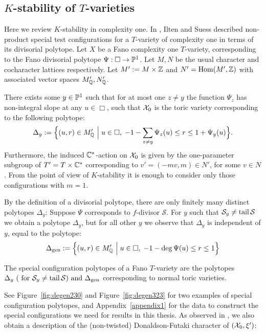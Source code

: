 \subsection{$K$-stability of $T$-varieties} \label{subsec:IS}
Here we review \(K\)-stability in complexity one. In \cite{ilten2015}, Ilten and Suess described non-product special test configurations for a \(T\)-variety of complexity one in terms of its divisorial polytope. Let \(X\) be a Fano complexity one \(T\)-variety, corresponding to the Fano divisorial polytope \(\Psi : \Box \to \mathbb{P}^1\). Let \(M,N\) be the usual character and cocharacter lattices respectively. Let \(M' := M \times \mathbb{Z}\) and \(N' = \operatorname{Hom}(M',\mathbb{Z})\) with associated vector spaces \(M_{\mathbb{Q}}', N_{\mathbb{Q}}'\).
\begin{theorem} \label{thm:iltensueskstab}
There exists some \(y \in \mathbb{P}^1\) such that for at most one \(z \neq y\) the function \(\Psi_z\) has non-integral slope at any \(u \in \Box\), such that \({\mathcal{X}}_0\) is the toric variety corresponding to the following polytope:
\begin{equation*}
\Delta_y := \Big\{(u,r) \in M_{\mathbb{Q}}' \ \Big| \; u \in \Box,\; -1-\sum_{z \neq y} \Psi_z(u) \leq r \leq 1+\Psi_y(u)\Big\}.\label{eq:special-fibre}
\end{equation*}
Furthermore, the induced \(\mathbb{C}^*\)-action on \({\mathcal{X}}_0\) is given by the one-parameter subgroup of \(T' = T \times \mathbb{C}^*\) corresponding to \(v'=(-mv,m) \in N'\), for some \(v \in N\). From the point of view of \(K\)-stability it is enough to consider only those configurations with \(m=1\). 
\end{theorem}
By the definition of a divisorial polytope, there are only finitely many distinct polytopes \(\Delta_y\): Suppose \(\Psi\) corresponds to \(f\)-divisor \(\mathcal{S}\). For \(y\) such that \(\mathcal{S}_y \neq \operatorname{tail} \mathcal{S}\) we obtain a polytope \(\Delta_y\), but for all other \(y\) we observe that \(\Delta_y\) is independent of \(y\), equal to the polytope: 
\[
\Delta_{\operatorname{gen}} := \Big\{(u,r) \in M_{\mathbb{Q}}' \ \Big| \; u \in \Box,\; -1- \deg \Psi (u) \leq r \leq 1\Big\}
\]
\begin{definition} \label{def:configpoly}
The special configuration polytopes of a Fano \(T\)-variety are the polytopes \( \Delta_y \ (\text{ for } \mathcal{S}_y \neq \operatorname{tail} \mathcal{S} )  \text{ and } \Delta_{\operatorname{gen}} \) corresponding to normal toric varieties.
\end{definition}
See Figure~\ref{fig:degen230} and Figure~\ref{fig:degen323} for two examples of special configuration polytopes, and Appendix~\ref{appendix1} for the data to construct the special configurations we need for results in this thesis. As observed in \cite{ilten2015}, we also obtain a description of the (non-twisted) Donaldson-Futaki character of $({\mathcal{X}}_0,\xi')$:
